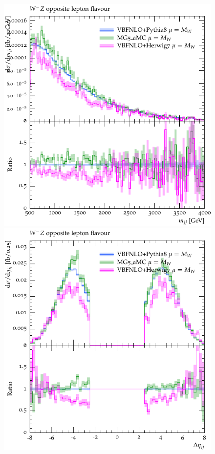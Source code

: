 \begin{figure}[htbp]
\begin{center}
   \includegraphics[scale=0.65]{figs/VBFNLO_WmZ_OF_mjj}
   \includegraphics[scale=0.65]{figs/VBFNLO_WmZ_OF_dEtajj}

\end{center}
\end{figure}
